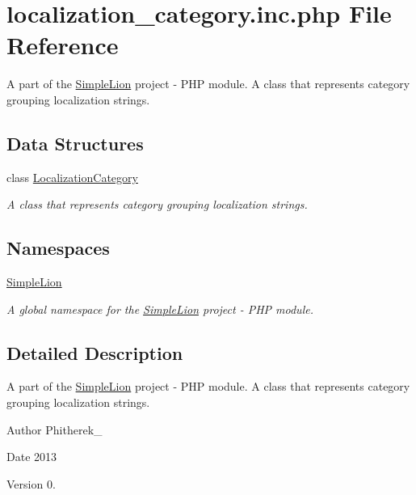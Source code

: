 \hypertarget{localization__category_8inc_8php}{\section{localization\-\_\-category.\-inc.\-php File Reference}
\label{localization__category_8inc_8php}
}


A part of the \hyperlink{namespace_simple_lion}{Simple\-Lion} project -\/ P\-H\-P module. A class that represents category grouping localization strings.  


\subsection*{Data Structures}
\begin{DoxyCompactItemize}
\item 
class \hyperlink{class_simple_lion_1_1_localization_category}{Localization\-Category}
\begin{DoxyCompactList}\small\item\em A class that represents category grouping localization strings. \end{DoxyCompactList}\end{DoxyCompactItemize}
\subsection*{Namespaces}
\begin{DoxyCompactItemize}
\item 
\hyperlink{namespace_simple_lion}{Simple\-Lion}
\begin{DoxyCompactList}\small\item\em A global namespace for the \hyperlink{namespace_simple_lion}{Simple\-Lion} project -\/ P\-H\-P module. \end{DoxyCompactList}\end{DoxyCompactItemize}


\subsection{Detailed Description}
A part of the \hyperlink{namespace_simple_lion}{Simple\-Lion} project -\/ P\-H\-P module. A class that represents category grouping localization strings. \begin{DoxyAuthor}{Author}
Phitherek\-\_\- 
\end{DoxyAuthor}
\begin{DoxyDate}{Date}
2013 
\end{DoxyDate}
\begin{DoxyVersion}{Version}
0. 
\end{DoxyVersion}
